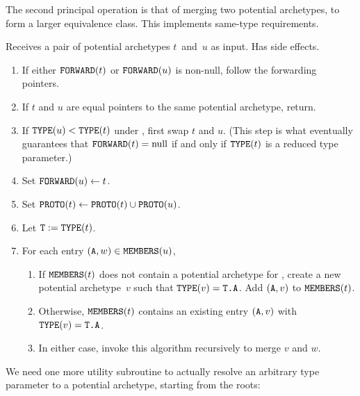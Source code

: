 \documentclass[../generics]{subfiles}
\begin{document}
The second principal operation is that of merging two potential archetypes, to form a larger equivalence class. This implements same-type requirements.

\begin{algorithm}\label{archetype builder merge}
Receives a pair of potential archetypes $t$~and~$u$ as input. Has side effects.
\begin{enumerate}
\item If either $\texttt{FORWARD}(t)$ or $\texttt{FORWARD}(u)$ is non-null, follow the forwarding pointers.
\item If $t$ and $u$ are equal pointers to the same potential archetype, return.
\item If $\texttt{TYPE}(u)<\texttt{TYPE}(t)$ under , first swap $t$ and $u$. (This step is what eventually guarantees that $\texttt{FORWARD}(t)=\text{null}$ if and only if $\texttt{TYPE}(t)$ is a reduced type parameter.)
\item Set $\texttt{FORWARD}(u)\leftarrow t$.
\item Set $\texttt{PROTO}(t)\leftarrow\texttt{PROTO}(t)\cup\texttt{PROTO}(u)$.
\item Let $\texttt{T}:=\texttt{TYPE}(t)$.
\item For each entry $(\texttt{A},w)\in\texttt{MEMBERS}(u)$,
\begin{enumerate}
\item If $\texttt{MEMBERS}(t)$ does not contain a potential archetype for \nA, create a new potential archetype~$v$ such that $\texttt{TYPE}(v)=\texttt{T.A}$. Add $(\texttt{A},v)$ to $\texttt{MEMBERS}(t)$.
\item Otherwise, $\texttt{MEMBERS}(t)$ contains an existing entry $(\texttt{A}, v)$ with $\texttt{TYPE}(v)=\texttt{T.A}$.
\item In either case, invoke this algorithm recursively to merge $v$ and $w$.
\end{enumerate}
\end{enumerate}
\end{algorithm}

We need one more utility subroutine to actually resolve an arbitrary type parameter to a potential archetype, starting from the roots:
\end{document}
